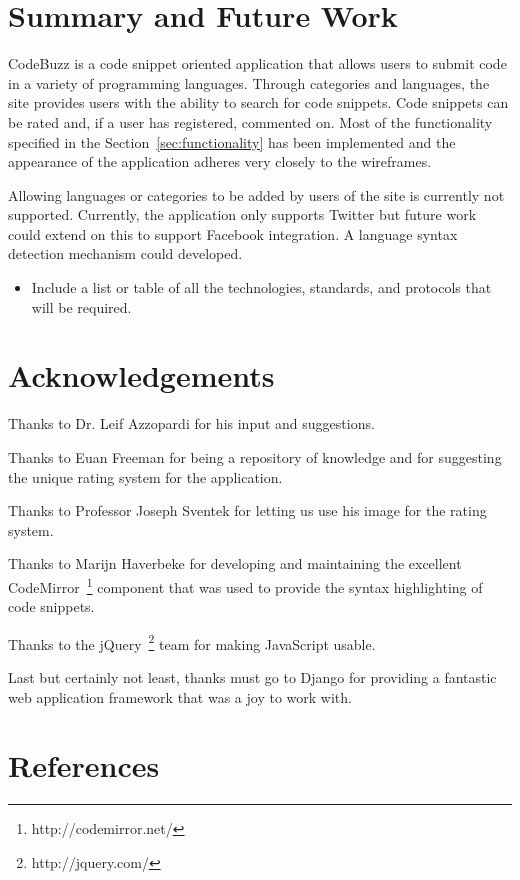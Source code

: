 \documentclass{sig-alt-release2}
\begin{document}
\section{Summary and Future Work}

CodeBuzz is a code snippet oriented application that allows users to submit code
in a variety of programming languages. Through categories and languages,
the site provides users with the ability to search for code snippets.
Code snippets can be rated and, if a user has registered, commented on.
Most of the functionality specified in the
Section~\ref{sec:functionality} has been implemented and the appearance
of the application adheres very closely to the wireframes.

Allowing languages or categories to be added by users of the site is
currently not supported.
Currently, the application only supports Twitter but future work could
extend on this to support Facebook integration. A language syntax
detection mechanism could developed.

\begin{itemize}
\item Include a list or table of all the technologies, standards,
and protocols that will be required.
\end{itemize}

\section{Acknowledgements}

Thanks to Dr. Leif Azzopardi for his input and suggestions.

Thanks to Euan Freeman for being a repository of knowledge and for
suggesting the unique rating system for the application.

Thanks to Professor Joseph Sventek for letting us use his image for the
rating system.

Thanks to Marijn Haverbeke for developing and maintaining the excellent
CodeMirror~\footnote{http://codemirror.net/} component that was used to
provide the syntax highlighting of code snippets.

Thanks to the jQuery~\footnote{http://jquery.com/} team for making
JavaScript usable.

Last but certainly not least, thanks must go to Django for providing
a fantastic web application framework that was a joy to work with.
\section{References}
\end{document}
